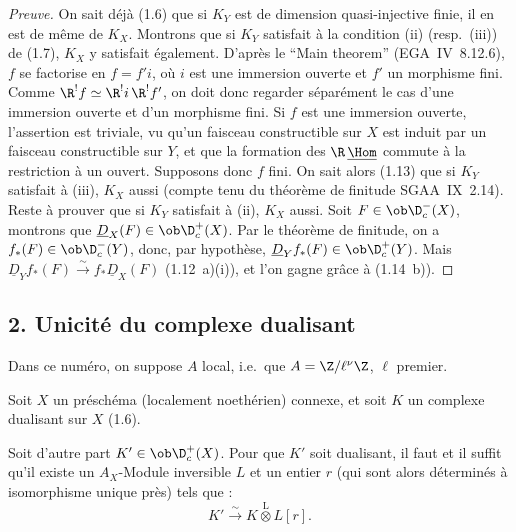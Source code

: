 \begin{proof}[Preuve]
On sait déjà (1.6) que si $K_Y$ est de dimension quasi-injective finie, il en est de même de $K_X$. Montrons que si $K_Y$ satisfait à la condition (ii) (resp.~(iii)) de (1.7), $K_X$ y satisfait également. D'après le ``Main theorem'' (EGA~IV~8.12.6), $f$ se factorise en $f = f'i$, où $i$ est une immersion ouverte et $f'$ un morphisme fini. Comme $\R^{!}f \simeq \R^{!}i \, \R^{!}f'$, on doit donc regarder séparément le cas d'une immersion ouverte et d'un morphisme fini. Si $f$ est une immersion ouverte, l'assertion est triviale, vu qu'un faisceau constructible sur $X$ est induit par un faisceau constructible sur $Y$, et que la formation des $\R\,\underline{\Hom}$ commute à la restriction à un ouvert. Supposons donc $f$ fini. On sait alors (1.13) que si $K_Y$ satisfait à (iii), $K_X$ aussi (compte tenu du théorème de finitude SGAA~IX~2.14). Reste à prouver que si $K_Y$ satisfait à (ii), $K_X$ aussi. Soit $F \in \ob \D_c^{-}(X)$, montrons que $\underline{D}_X(F) \in \ob \D_c^{+}(X)$. Par le théorème de finitude, on a $f_{*}(F) \in \ob \D_c^{-}(Y)$, donc, par hypothèse, $\underline{D}_Y f_{*}(F) \in \ob \D_c^{+}(Y)$. Mais $\underline{D}_Y f_{*}(F) \xrightarrow{\sim} f_{*}\underline{D}_X(F)$ (1.12~a)(i)), et l'on gagne grâce à (1.14~b)).
\end{proof}

\subsection{2. Unicité du complexe dualisant}

Dans ce numéro, on suppose $A$ local, i.e.~que $A = \Z/\ell^{\nu}\Z$, $\ell$ premier.

\begin{theorem}[cf.~{\upshape [H]~V~3.1}]
Soit $X$ un préschéma (localement noethérien) connexe, et soit $K$ un complexe dualisant sur $X$ (1.6).

Soit d'autre part $K' \in \ob \D_c^{+}(X)$. Pour que $K'$ soit dualisant, il faut et il suffit qu'il existe un $A_X$-Module inversible $L$ et un entier $r$ (qui sont alors déterminés à isomorphisme unique près) tels que :
\[
K' \xrightarrow{\sim} K \mathop{\otimes}\limits^{\mathrm{L}} L[r].
\]
\end{theorem}

